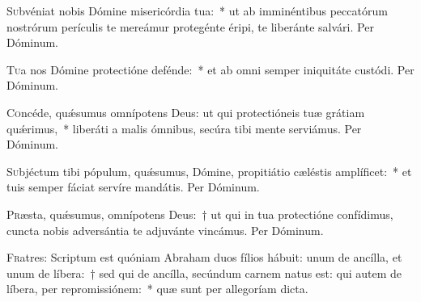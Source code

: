 \documentclass[vesperale_romanum.tex]{subfiles}
\begin{document}


\oratio

\lettrine{S}{u}bvéniat nobis Dómine misericórdia tua:~* ut ab imminéntibus peccatórum nostrórum perículis te mereámur protegénte éripi, te liberánte salvári.
Per Dóminum.



\oratio

\lettrine{T}{u}a nos Dómine prote\-ctióne defénde:~* et ab omni semper iniquitáte custódi. Per Dóminum.



\oratio

\lettrine{C}{o}ncéde, quǽsumus omnípotens Deus: ut qui prote\-ctióneis tuæ grátiam quǽrimus,~* liberáti a malis ómnibus, secúra tibi mente serviámus. Per Dóminum.



\oratio

\lettrine{S}{u}bjéctum tibi pópulum, quǽsumus, Dómine, propitiátio cæléstis amplíficet:~* et tuis semper fáciat servíre mandátis. Per Dóminum.



\oratio

\lettrine{P}{r}æsta, quǽsumus, omnípotens Deus:~† ut qui in tua prote\-ctióne confídimus, cun\-cta nobis adversántia te adjuvánte vincámus. Per Dóminum.
\newpage
{}


\lettrine{F}{r}atres: Scriptum est quóniam Abraham duos fílios hábuit: unum de ancílla, et unum de líbera:~† sed qui de ancílla, secúndum carnem natus est: qui autem de líbera, per repromissiónem:~* quæ sunt per allegoríam dicta.


\end{document}
